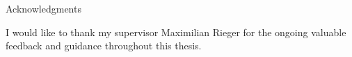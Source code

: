 \thispagestyle{empty}

\vspace*{20mm}

\begin{center}
    { Acknowledgments}
\end{center}

\vspace{10mm}

I would like to thank my supervisor Maximilian Rieger for the ongoing valuable feedback and guidance throughout this thesis.

\cleardoublepage{}
